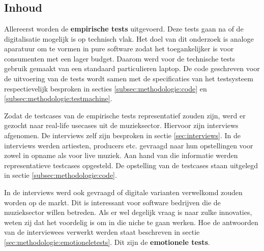 
\chapter{}
\label{ch:methodologie}


\section{Inhoud}

Allereerst worden de \textbf{empirische tests} uitgevoerd. Deze tests gaan na of de digitalisatie mogelijk is op technisch vlak. Het doel van dit onderzoek is analoge aparatuur om te vormen in pure software zodat het toegankelijker is voor consumenten met een lager budget. Daarom werd voor de technische tests gebruik gemaakt van een standaard particulieren laptop. De code geschreven voor de uitvoering van de tests wordt samen met de specificaties van het testsysteem respectievelijk besproken in secties \ref{subsec:methodologie:code} en \ref{subsec:methodologie:testmachine}.

Zodat de testcases van de empirische tests representatief zouden zijn, werd er gezocht naar real-life usecases uit de muzieksector. Hiervoor zijn interviews afgenomen. De interviews zelf zijn besproken in sectie \ref{sec:interviews}. In de interviews werden artiesten, producers etc. gevraagd naar hun opstellingen voor zowel in opname als voor live muziek. Aan hand van die informatie werden representatieve testcases opgesteld. De opstelling van de testcases staan uitgelegd in sectie \ref{subsec:methodologie:code}. 

In de interviews werd ook gevraagd of digitale varianten verwelkomd zouden worden op de markt. Dit is interessant voor software bedrijven die de muzieksector willen betreden. Als er wel degelijk vraag is naar zulke innovaties, weten zij dat het voordelig is om in die niche te gaan werken. Hoe de antwoorden van de interviewees verwerkt werden staat beschreven in sectie \ref{sec:methodologie:emotioneletests}. Dit zijn de \textbf{emotionele tests}.

